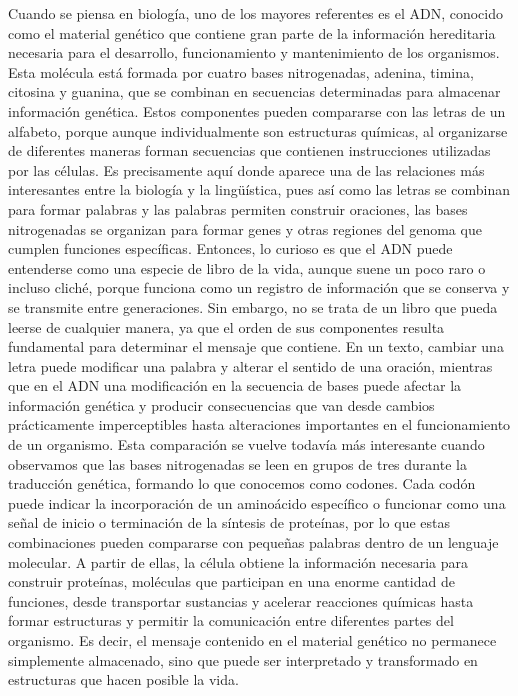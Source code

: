 \documentclass[12pt]{article}
\begin{document}
Cuando se piensa en biología, uno de los mayores referentes es el ADN, conocido como el material genético que contiene gran parte de la información hereditaria necesaria para el desarrollo, funcionamiento y mantenimiento de los organismos. Esta molécula está formada por cuatro bases nitrogenadas, adenina, timina, citosina y guanina, que se combinan en secuencias determinadas para almacenar información genética. Estos componentes pueden compararse con las letras de un alfabeto, porque aunque individualmente son estructuras químicas, al organizarse de diferentes maneras forman secuencias que contienen instrucciones utilizadas por las células. Es precisamente aquí donde aparece una de las relaciones más interesantes entre la biología y la lingüística, pues así como las letras se combinan para formar palabras y las palabras permiten construir oraciones, las bases nitrogenadas se organizan para formar genes y otras regiones del genoma que cumplen funciones específicas.
Entonces, lo curioso es que el ADN puede entenderse como una especie de libro de la vida, aunque suene un poco raro o incluso cliché, porque funciona como un registro de información que se conserva y se transmite entre generaciones. Sin embargo, no se trata de un libro que pueda leerse de cualquier manera, ya que el orden de sus componentes resulta fundamental para determinar el mensaje que contiene. En un texto, cambiar una letra puede modificar una palabra y alterar el sentido de una oración, mientras que en el ADN una modificación en la secuencia de bases puede afectar la información genética y producir consecuencias que van desde cambios prácticamente imperceptibles hasta alteraciones importantes en el funcionamiento de un organismo.
Esta comparación se vuelve todavía más interesante cuando observamos que las bases nitrogenadas se leen en grupos de tres durante la traducción genética, formando lo que conocemos como codones. Cada codón puede indicar la incorporación de un aminoácido específico o funcionar como una señal de inicio o terminación de la síntesis de proteínas, por lo que estas combinaciones pueden compararse con pequeñas palabras dentro de un lenguaje molecular. A partir de ellas, la célula obtiene la información necesaria para construir proteínas, moléculas que participan en una enorme cantidad de funciones, desde transportar sustancias y acelerar reacciones químicas hasta formar estructuras y permitir la comunicación entre diferentes partes del organismo. Es decir, el mensaje contenido en el material genético no permanece simplemente almacenado, sino que puede ser interpretado y transformado en estructuras que hacen posible la vida.
\end{document}
